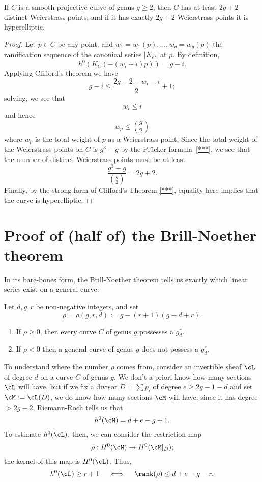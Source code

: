 \begin{lemma}
If $C$ is a smooth projective curve of genus $g \geq 2$, then $C$ has at least $2g+2$ distinct Weierstrass points; and if it has exactly $2g+2$ Weierstrass points it is hyperelliptic.
\end{lemma}

\begin{proof}
Let $p \in C$ be any point, and $w_1=w_1(p),\dots,w_g = w_g(p)$ the ramification sequence of the canonical series $|K_C|$ at $p$. By definition, 
$$
h^0(K_C(-(w_i+i)p)) = g - i.
$$
Applying Clifford's theorem we have
$$
g-i \leq \frac{2g - 2 - w_i - i}{2} + 1;
$$
solving, we see that
$$
w_i \leq i
$$
and hence
$$
w_p \leq \binom{g}{2}
$$
where $w_p$ is the total weight of $p$ as a Weierstrass point. Since the total weight of the Weierstrass points on $C$ is $g^3-g$ by the Pl\"ucker formula~\ref{***}, we see that the number of distinct Weierstrass points must be at least
$$
\frac{g^3-g}{\binom{g}{2}} = 2g+2.
$$
Finally, by the strong form of Clifford's Theorem \ref{***}, equality here implies that the curve is hyperelliptic.
\end{proof}

\section{Proof of (half of) the Brill-Noether theorem}

In its bare-bones form, the Brill-Noether theorem tells us exactly which linear series exist on a general curve:

\begin{theorem}\label{basic Brill Noether}
Let $d,g,r$ be non-negative integers, and set 
$$
\rho =\rho(g,r,d) := g - (r+1)(g-d+r).
$$
 \begin{enumerate}
\item If $\rho \geq 0$, then every curve $C$ of genus $g$ possesses a $g^r_d$.
\item If $\rho < 0$ then a general curve of genus $g$ does not possess a $g^r_d$.
\end{enumerate}
\end{theorem}


To understand where the number $\rho$ comes from, consider an invertible sheaf $\cL$ of degree $d$ on a curve $C$ of genus $g$. We don't a priori know how many sections $\cL$ will have, but if we fix a divisor $D = \sum p_i$ of degree $e \geq 2g-1-d$ and set $\cM:= \cL(D)$, we do know how many sections $\cM$ will have: since it has degree $> 2g-2$, Riemann-Roch tells us that
$$
h^0(\cM) = d + e - g + 1.
$$
To estimate $h^0(\cL)$, then, we can consider the restriction map
$$
\rho : H^0(\cM) \to H^0(\cM|_D);
$$
the kernel of this map is $H^0(\cL)$. Thus,
$$
h^0(\cL) \geq r+1 \quad \iff \quad \rank(\rho) \leq d+e-g-r.
$$

